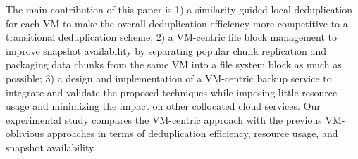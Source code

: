 The main contribution of this paper is
1) a similarity-guided local deduplication for
each VM to make the overall deduplication efficiency more competitive 
to a transitional deduplication scheme;
2) a VM-centric file block management to improve snapshot availability by
separating popular chunk replication and
packaging data chunks from the same VM into a file system block as much as possible; 
3) a design and implementation of a VM-centric  backup service to integrate and validate
the proposed techniques while imposing  little resource usage and  minimizing the impact on other collocated cloud services.
Our  experimental study compares  the VM-centric approach with the previous 
VM-oblivious approaches in terms of deduplication efficiency, resource usage,  and snapshot availability.

 


